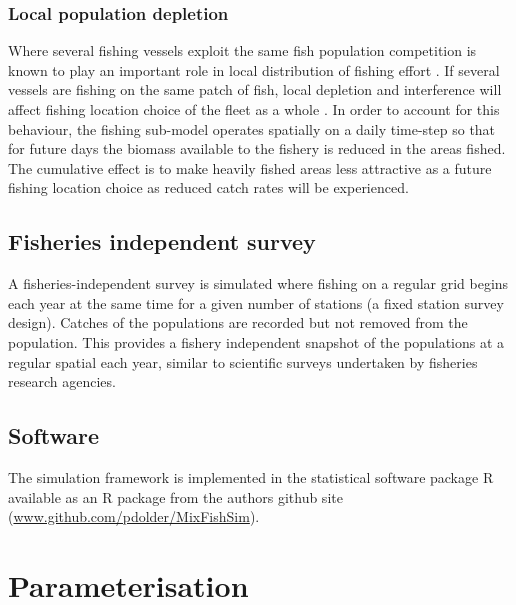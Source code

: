 \documentclass[review]{elsarticle}
\begin{document}
\subsubsection{Local population depletion}

Where several fishing vessels exploit the same fish population competition is
known to play an important role in local distribution of fishing effort
\citep{Gillis1998}. If several vessels are fishing on the same patch of fish,
local depletion and interference  will affect fishing
location choice of the fleet as a whole \citep{Rijnsdorp2000, Poos2007a}. In
order to account for this behaviour, the fishing sub-model operates spatially
on a daily time-step so that for future days the biomass available to the
fishery is reduced in the areas fished. The cumulative effect is to make
heavily fished areas less attractive as a future fishing location choice as
reduced catch rates will be experienced. 

\subsection{Fisheries independent survey}

A fisheries-independent survey is simulated where fishing on a regular grid
begins each year at the same time for a given number of stations (a fixed
station survey design). Catches of the populations  are recorded but not removed from the population. This
provides a fishery independent snapshot of the populations at a regular spatial
 each year, similar to scientific
surveys undertaken by fisheries research agencies. \\

\subsection{Software}

The simulation framework is implemented in the statistical software package R
\citep{RCoreTeam2017}  available as an R package from
the authors github site (\url{www.github.com/pdolder/MixFishSim}).\\

\section{Parameterisation}
\end{document}
